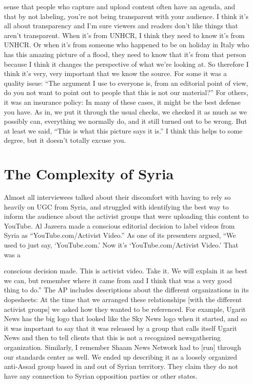\begin{enumerate}
sense that people who capture and upload content often have an agenda,
and that by not labeling, you're not being transparent with your audience.
I think it's all about transparency and I'm sure viewers and readers
don't like things that aren't transparent. When it's from UNHCR, I
think they need to know it's from UNHCR. Or when it's from someone
who happened to be on holiday in Italy who has this amazing
picture of a flood, they need to know that it's from that person
because I think it changes the perspective of what we're looking at.
So therefore I think it's very, very important that we know the source.
For some it was a quality issue: ``The argument I use to everyone is, from an
editorial point of view, do you not want to point out to people that this is
not our material?'' For others, it was an insurance policy:
In many of these cases, it might be the best defense you have. As
in, we put it through the usual checks, we checked it as much as we
possibly can, everything we normally do, and it still turned out to be
wrong. But at least we said, ``This is what this picture says it is.'' I think
this helps to some degree, but it doesn't totally excuse you.
\section{The Complexity of Syria}
Almost all interviewees talked about their discomfort with having to rely
so heavily on UGC from Syria, and struggled with identifying the best way
to inform the audience about the activist groups that were uploading this
content to YouTube.
Al Jazeera made a conscious editorial decision to label videos from Syria as
``YouTube.com/Activist Video.'' As one of its presenters argued, ``We used to
just say, ‘YouTube.com.' Now it's ‘YouTube.com/Activist Video.' That was a

conscious decision made. This is activist video. Take it. We will explain it as
best we can, but remember where it came from and I think that was a very
good thing to do.''
The AP includes descriptions about the different organizations in
its dopesheets:
At the time that we arranged these relationships [with the different
activist groups] we asked how they wanted to be referenced.
For example, Ugarit News has the big logo that looked like the Sky
News logo when it started, and so it was important to say that it was
released by a group that calls itself Ugarit News and then to tell clients
that this is not a recognized newsgathering organization. Similarly,
I remember Shaam News Network had to [run] through our
standards center as well. We ended up describing it as a loosely organized
anti-Assad group based in and out of Syrian territory. They
claim they do not have any connection to Syrian opposition parties
or other states.

\end{enumerate}
